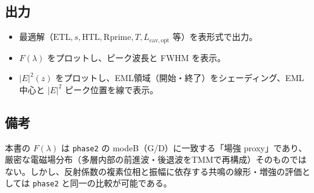 \subsection{出力}
\begin{itemize}
\item 最適解（\(\mathrm{ETL}, s, \text{HTL}, \text{Rprime}, T, L_{\mathrm{cav,opt}}\) 等）を表形式で出力。
\item \(F(\lambda)\) をプロットし、ピーク波長と FWHM を表示。
\item \(|E|^2(z)\) をプロットし、EML領域（開始・終了）をシェーディング、EML中心と \(|E|^2\) ピーク位置を線で表示。
\end{itemize}

\subsection*{備考}
本書の \(F(\lambda)\) は \texttt{phase2} の modeB（G/D）に一致する「場強 proxy」であり、厳密な電磁場分布（多層内部の前進波・後退波をTMMで再構成）そのものではない。しかし、反射係数の複素位相と振幅に依存する共鳴の線形・増強の評価としては \texttt{phase2} と同一の比較が可能である。


